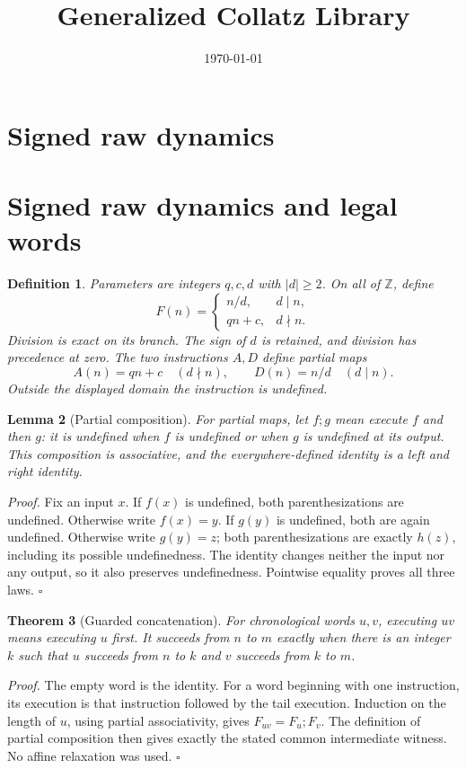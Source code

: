 \documentclass[11pt,letterpaper]{article}
\title{Generalized Collatz Library}
\author{}
\date{\today}
\newcommand{\Z}{\mathbb{Z}}
\newtheorem{theorem}{Theorem}
\newtheorem{lemma}[theorem]{Lemma}
\newtheorem{definition}[theorem]{Definition}
\newenvironment{proof}{\noindent\textit{Proof.}}{\hfill\(\square\)}
\begin{document}
\maketitle
\section*{Signed raw dynamics}

\section{Signed raw dynamics and legal words}

\begin{definition}
Parameters are integers \(q,c,d\) with \(|d|\ge2\). On all of \(\Z\), define
\[
F(n)=\begin{cases}
n/d,&d\mid n,\\
qn+c,&d\nmid n.
\end{cases}
\]
Division is exact on its branch. The sign of \(d\) is retained, and division has
precedence at zero. The two instructions \(A,D\) define partial maps
\[
A(n)=qn+c\quad(d\nmid n),\qquad D(n)=n/d\quad(d\mid n).
\]
Outside the displayed domain the instruction is undefined.
\end{definition}

\begin{lemma}[Partial composition]
For partial maps, let \(f;g\) mean execute \(f\) and then \(g\): it is undefined when
\(f\) is undefined or when \(g\) is undefined at its output. This composition is
associative, and the everywhere-defined identity is a left and right identity.
\end{lemma}
\begin{proof}
Fix an input \(x\). If \(f(x)\) is undefined, both parenthesizations are undefined.
Otherwise write \(f(x)=y\). If \(g(y)\) is undefined, both are again undefined.
Otherwise write \(g(y)=z\); both parenthesizations are exactly \(h(z)\), including
its possible undefinedness. The identity changes neither the input nor any output,
so it also preserves undefinedness. Pointwise equality proves all three laws.
\end{proof}

\begin{theorem}[Guarded concatenation]
For chronological words \(u,v\), executing \(uv\) means executing \(u\) first.
It succeeds from \(n\) to \(m\) exactly when there is an integer \(k\) such that
\(u\) succeeds from \(n\) to \(k\) and \(v\) succeeds from \(k\) to \(m\).
\end{theorem}
\begin{proof}
The empty word is the identity. For a word beginning with one instruction, its
execution is that instruction followed by the tail execution. Induction on the
length of \(u\), using partial associativity, gives
\(F_{uv}=F_u;F_v\). The definition of partial composition then gives exactly the
stated common intermediate witness. No affine relaxation was used.
\end{proof}
\end{document}
